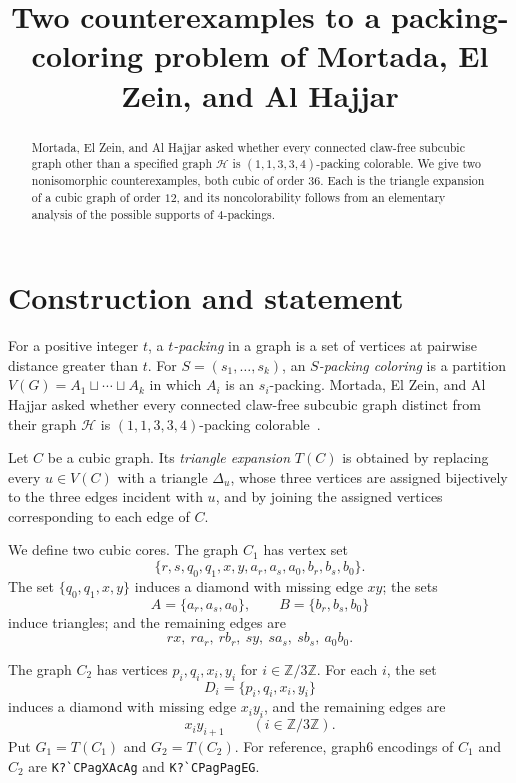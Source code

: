 \documentclass[11pt]{amsart}
\title[Counterexamples to a packing-coloring problem]
{Two counterexamples to a packing-coloring problem of Mortada, El Zein, and Al Hajjar}
\date{}
\newcommand{\Zthree}{\mathbb Z/3\mathbb Z}
\begin{document}
\begin{abstract}
Mortada, El Zein, and Al Hajjar asked whether every connected claw-free
subcubic graph other than a specified graph $\mathcal H$ is
$(1,1,3,3,4)$-packing colorable. We give two nonisomorphic counterexamples,
both cubic of order $36$. Each is the triangle expansion of a cubic graph
of order $12$, and its noncolorability follows from an elementary analysis
of the possible supports of $4$-packings.
\end{abstract}

\maketitle

\section{Construction and statement}

For a positive integer $t$, a \emph{$t$-packing} in a graph is a set of
vertices at pairwise distance greater than $t$. For
$S=(s_1,\ldots,s_k)$, an \emph{$S$-packing coloring} is a partition
$V(G)=A_1\sqcup\cdots\sqcup A_k$ in which $A_i$ is an $s_i$-packing.
Mortada, El Zein, and Al Hajjar asked whether every connected claw-free
subcubic graph distinct from their graph $\mathcal H$ is
$(1,1,3,3,4)$-packing colorable~\cite[Problem~1]{MEH}.

Let $C$ be a cubic graph. Its \emph{triangle expansion} $T(C)$ is obtained
by replacing every $u\in V(C)$ with a triangle $\Delta_u$, whose three
vertices are assigned bijectively to the three edges incident with $u$,
and by joining the assigned vertices corresponding to each edge of $C$.

We define two cubic cores. The graph $C_1$ has vertex set
\[
 \{r,s,q_0,q_1,x,y,a_r,a_s,a_0,b_r,b_s,b_0\}.
\]
The set $\{q_0,q_1,x,y\}$ induces a diamond with missing edge $xy$; the
sets
\[
 A=\{a_r,a_s,a_0\},\qquad B=\{b_r,b_s,b_0\}
\]
induce triangles; and the remaining edges are
\[
 rx,\ ra_r,\ rb_r,\ sy,\ sa_s,\ sb_s,\ a_0b_0.
\]

The graph $C_2$ has vertices $p_i,q_i,x_i,y_i$ for $i\in\Zthree$. For
each $i$, the set
\[
 D_i=\{p_i,q_i,x_i,y_i\}
\]
induces a diamond with missing edge $x_i y_i$, and the remaining edges are
\[
 x_i y_{i+1}\qquad(i\in\Zthree).
\]
Put $G_1=T(C_1)$ and $G_2=T(C_2)$. For reference, graph6 encodings of
$C_1$ and $C_2$ are \verb|K?`CPagXAcAg| and \verb|K?`CPagPagEG|.
\end{document}
